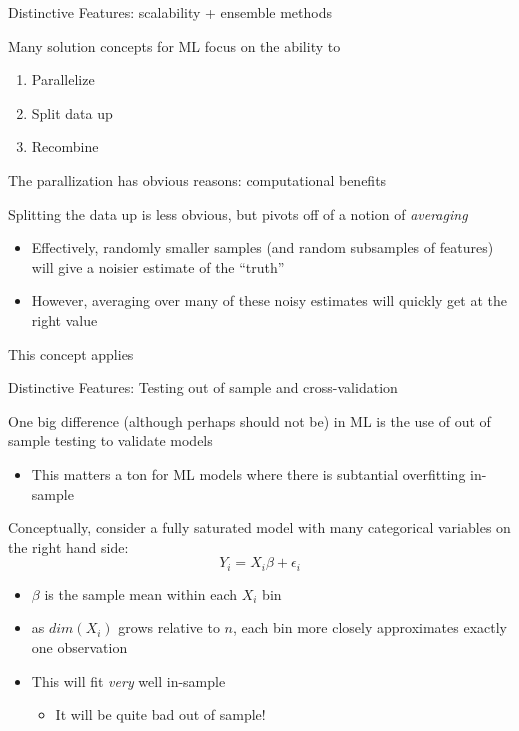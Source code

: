 \documentclass[notes,11pt, aspectratio=169]{beamer}
\newenvironment{wideitemize}{\itemize\addtolength{\itemsep}{10pt}}{\enditemize}
\begin{document}
\begin{frame}{Distinctive Features: scalability + ensemble methods}
  \begin{wideitemize}
  \item Many solution concepts for ML focus on the ability to
    \begin{enumerate}
    \item Parallelize
    \item Split data up
    \item Recombine
    \end{enumerate}
  \item The parallization has obvious reasons: computational benefits
  \item Splitting the data up is less obvious, but pivots off of a
    notion of \emph{averaging}
    \begin{itemize}
    \item Effectively, randomly smaller samples (and random subsamples
      of features) will give a noisier estimate of the ``truth''
    \item However, averaging over many of these noisy estimates will
      quickly get at the right value
    \end{itemize}
  \item This concept applies 
  \end{wideitemize}
\end{frame}

\begin{frame}{Distinctive Features: Testing out of sample and cross-validation}
  \begin{wideitemize}
  \item One big difference (although perhaps should not be) in ML is
    the use of out of sample testing to validate models
    \begin{itemize}
    \item This matters a ton for ML models where there is subtantial overfitting in-sample
    \end{itemize}
  \item Conceptually, consider a fully saturated model with many
    categorical variables on the right hand side:
    $$Y_{i} = X_{i}\beta + \epsilon_{i}$$
    \begin{itemize}
    \item $\beta$ is the sample mean within each $X_{i}$ bin
    \item as $dim(X_{i})$ grows relative to $n$, each bin more closely
      approximates exactly one observation
    \item This will fit \emph{very} well in-sample
      \begin{itemize}
      \item It will be quite bad out of sample!
      \end{itemize}
    \end{itemize}
  \end{wideitemize}
\end{frame}
\end{document}
